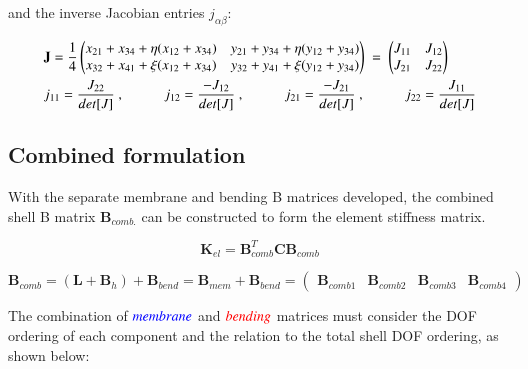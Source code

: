 and the inverse Jacobian entries $j_{\alpha \beta}$:

\begin{gather} 
	\begin{aligned}
		&\mathbf{J} = \frac{1}{4}
		\begin{pmatrix}
			x_{21} + x_{34} + \eta (x_{12} + x_{34}) & y_{21} + y_{34} + \eta (y_{12} + y_{34}) \\
			x_{32} + x_{41} + \xi (x_{12} + x_{34}) & y_{32} + y_{41} + \xi (y_{12} + y_{34})
		\end{pmatrix}
		\ = \ 
		\begin{pmatrix}
			J_{11} & J_{12} \\
			J_{21} & J_{22}
		\end{pmatrix} \\
		&j_{11} = \frac{J_{22}}{det[J]}\ ,
		\hspace{10mm}
		j_{12} = \frac{-J_{12}}{det[J]}\ ,
		\hspace{10mm}
		j_{21} = \frac{-J_{21}}{det[J]}\ ,
		\hspace{10mm}
		j_{22} = \frac{J_{11}}{det[J]}
		\label{equation29}
	\end{aligned}
\end{gather}




\subsection{Combined formulation}

With the separate membrane and bending B matrices developed, the combined shell B matrix $\textbf{B}_{comb.}$ can be constructed to form the element stiffness matrix.

\begin{equation} 
\textbf{K}_{el} = \textbf{B}_{comb}^T \textbf{C} \textbf{B}_{comb} 
\label{equation30}
\end{equation}

\begin{equation} 
\textbf{B}_{comb} = (\mathbf{L} + \mathbf{B}_h) + \mathbf{B}_{bend} = \mathbf{B}_{mem} + \mathbf{B}_{bend} = 
\begin{pmatrix}
\mathbf{B}_{comb1} & \mathbf{B}_{comb2} & \mathbf{B}_{comb3} & \mathbf{B}_{comb4}
\end{pmatrix}
\label{equation31}
\end{equation}

The combination of $\textcolor{blue}{membrane}$ and $\textcolor{red}{bending}$ matrices must consider the DOF ordering of each component and the relation to the total shell DOF ordering, as shown below:

